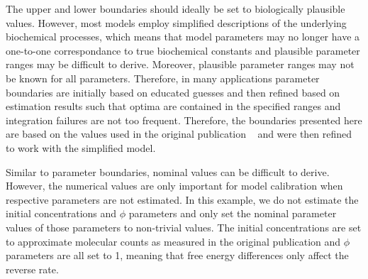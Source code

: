 \documentclass[11pt]{article}
\begin{document}
The upper and lower boundaries should ideally be set to biologically
plausible values. However, most models employ simplified descriptions of
the underlying biochemical processes, which means that model parameters
may no longer have a one-to-one correspondance to true biochemical
constants and plausible parameter ranges may be difficult to derive.
Moreover, plausible parameter ranges may not be known for all
parameters. Therefore, in many applications parameter boundaries are
initially based on educated guesses and then refined based on estimation
results such that optima are contained in the specified ranges and
integration failures are not too frequent. Therefore, the boundaries
presented here are based on the values used in the original publication
~\cite{2754712/I4JQ4DMV} and were then refined to work with the
simplified model.

Similar to parameter boundaries, nominal values can be difficult to
derive. However, the numerical values are only important for model
calibration when respective parameters are not estimated. In this
example, we do not estimate the initial concentrations and \(\phi\)
parameters and only set the nominal parameter values of those parameters
to non-trivial values. The initial concentrations are set to approximate
molecular counts as measured in the original publication and \(\phi\)
parameters are all set to 1, meaning that free energy differences only
affect the reverse rate.
\end{document}
